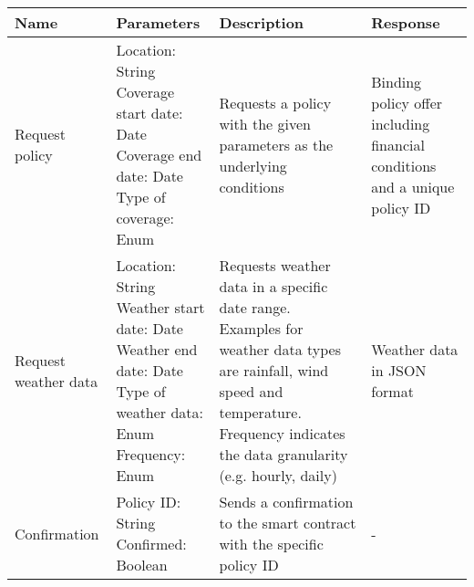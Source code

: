 \renewcommand{\arraystretch}{1.3}
\begin{tabular}{|>{\centering\arraybackslash}m{2cm}|>{\centering\arraybackslash}p{5cm}|>{\centering\arraybackslash}m{5cm}|>{\centering\arraybackslash}m{3cm}|}
    \hline
    \textbf{Name} & \textbf{Parameters} & \textbf{Description} & \textbf{Response} \\ 
    \hline
    Request policy & \makecell{Location: String \\ Coverage start date: Date \\ Coverage end date: Date \\ Type of coverage: Enum}  & Requests a policy with the given parameters as the underlying conditions & Binding policy offer including financial conditions and a unique policy ID\\ 
    \hline
    Request weather data & \makecell{Location: String \\ Weather start date: Date \\ Weather end date: Date \\ Type of weather data: Enum \\ Frequency: Enum } & Requests weather data in a specific date range. Examples for weather data types are rainfall, wind speed and temperature. Frequency indicates the data granularity (e.g. hourly, daily) & Weather data in JSON format \\ 
    \hline
    Confirmation & \makecell{Policy ID: String \\ Confirmed: Boolean} & Sends a confirmation to the smart contract with the specific policy ID & - \\ 
    \hline
\end{tabular}